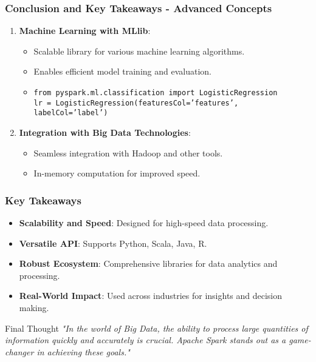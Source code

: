 \documentclass[aspectratio=169]{beamer}
\begin{document}
\begin{frame}[fragile]
    \frametitle{Conclusion and Key Takeaways - Advanced Concepts}
    \begin{enumerate}[resume]
        \item \textbf{Machine Learning with MLlib}:
            \begin{itemize}
                \item Scalable library for various machine learning algorithms.
                \item Enables efficient model training and evaluation.
                \item \texttt{from pyspark.ml.classification import LogisticRegression}\\ 
                \texttt{lr = LogisticRegression(featuresCol='features', labelCol='label')}
            \end{itemize}

        \item \textbf{Integration with Big Data Technologies}:
            \begin{itemize}
                \item Seamless integration with Hadoop and other tools.
                \item In-memory computation for improved speed.
            \end{itemize}
    \end{enumerate}
\end{frame}

\begin{frame}[fragile]
    \frametitle{Key Takeaways}
    \begin{itemize}
        \item \textbf{Scalability and Speed}: Designed for high-speed data processing.
        \item \textbf{Versatile API}: Supports Python, Scala, Java, R.
        \item \textbf{Robust Ecosystem}: Comprehensive libraries for data analytics and processing.
        \item \textbf{Real-World Impact}: Used across industries for insights and decision making.
    \end{itemize}
    \begin{block}{Final Thought}
        \emph{"In the world of Big Data, the ability to process large quantities of information quickly and accurately is crucial. Apache Spark stands out as a game-changer in achieving these goals."}
    \end{block}
\end{frame}
\end{document}
